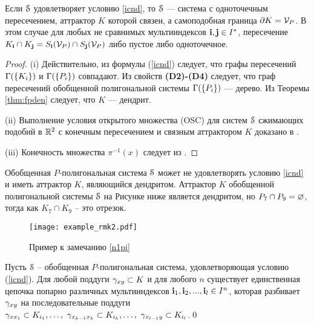 \begin{remark}\label{fpro} 
Если ${\EuScript S}$ удовлетворяет условию \eqref{icnd}, то ${\EuScript S}$ --- система с одноточечным пересечением, аттрактор $K$ которой связен, а самоподобная граница $\partial K={\mathcal V}_P$. 
В этом случае для любых не сравнимых мультииндексов ${\bf{i}},{\bf{j}}\in I^*$, пересечение $K_{\bf{i}}\cap K_{\bf{j}}=S_{\bf{i}}({\mathcal V}_P)\cap S_{\bf{j}}({\mathcal V}_P)$ либо пустое либо одноточечное.
\end{remark}

\begin{proof}
(i) Действительно, из формулы (\ref{icnd}) следует, что графы пересечений $\Gamma(\{K_i\})$ и $\Gamma(\{P_i\})$ совпадают. 
Из свойств {\bf (D2)-(D4)} следует, что граф пересечений обобщенной полигональной системы  $\Gamma(\{P_i\})$ --- дерево. 
Из Теоремы \ref{thm:fpden} следует, что $K$ --- дендрит.

(ii) Выполнение условия открытого множества (OSC) для систем ${\EuScript S}$ сжимающих подобий в $\mathbb{R}^2$ с конечным пересечением и связным аттрактором $K$ доказано в \cite{BR}.

(iii) Конечность множества $\pi^{-1}(x)$ следует из \cite[Proposition 2.3]{FIP}.
\end{proof}




\begin{remark}\label{n1pi}  
Обобщенная $P$-полигональная система ${\EuScript S}$ может не удовлетворять условию \eqref{icnd} и иметь аттрактор $K$, являющийся дендритом. 
Аттрактор $K$ обобщенной полигональной системы ${\EuScript S}$ на Рисунке ниже является дендритом, но  $P_7\cap P_9=\varnothing$, тогда как $K_7\cap K_9$ -- это отрезок.
\end{remark}

\begin{figure}[H]
    \centering
    \texttt{[image: example\_rmk2.pdf]}
    \caption{Пример к замечанию \ref{n1pi}}
\label{img:rmk1}
\end{figure}

\begin{corollary}
Пусть ${\EuScript S}$ -- обобщенная $P$-полигональная система, удовлетворяющая условию (\ref{icnd}). Для любой поддуги $\gamma_{xy}\subset K$ и для любого $n$ существует единственная цепочка попарно различных мультииндексов ${\bf{i}}_1,{\bf{i}}_2,...,{\bf{i}}_l\in I^n$, которая разбивает $\gamma_{xy}$ на последовательные поддуги $\gamma_{xx_1}\subset K_{i_1},\ldots,\ \gamma_{x_{k-1}x_k}\subset K_{i_k},\ldots,\ \gamma_{x_{l-1}y}\subset K_{i_l}$.\qed
\end{corollary}


